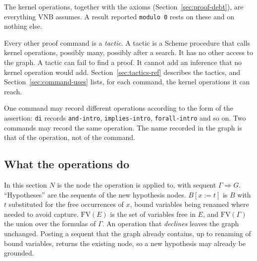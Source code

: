 The kernel operations, together with the axioms
(Section~\ref{sec:proof-debt}), are everything VNB assumes.  A result
reported \texttt{modulo 0} rests on these and on nothing else.

Every other proof command is a \emph{tactic}.  A tactic is a Scheme
procedure that calls kernel operations, possibly many, possibly after a
search.  It has no other access to the graph.  A tactic can fail to find
a proof.  It cannot add an inference that no kernel operation would add.
Section~\ref{sec:tactics-ref} describes the tactics, and
Section~\ref{sec:command-uses} lists, for each command, the kernel
operations it can reach.

\begin{remark}
One command may record different operations according to the form of the
assertion: \texttt{di} records \texttt{and-intro}, \texttt{implies-intro},
\texttt{forall-intro} and so on.  Two commands may record the same
operation.  The name recorded in the graph is that of the operation, not
of the command.
\end{remark}

\subsection{What the operations do}\label{sec:kernel-ops-detail}

\providecommand{\VNBfig}[3]{\[\frac{\displaystyle #2}{\displaystyle #3}\;\;\mbox{\texttt{#1}}\]}
\providecommand{\VNBnohyp}{\phantom{\Gamma}}
\providecommand{\FV}{\mathrm{FV}}
\providecommand{\aeq}{=_{\alpha}}
\providecommand{\VNBfigS}[3]{\[\frac{\displaystyle\begin{array}{c}#2\end{array}}{\displaystyle #3}\;\;\mbox{\texttt{#1}}\]}
\newenvironment{VNBcond}{\sloppy\begin{description}[font=\normalfont\itshape,leftmargin=0.85cm,itemsep=0.5mm,topsep=0.5mm]}{\end{description}}

In this section $N$ is the node the operation is applied to, with
sequent $\Gamma \Longrightarrow G$.  ``Hypotheses'' are the sequents of
the new hypothesis nodes.  $B[x{:=}t]$ is $B$ with $t$
substituted for the free occurrences of $x$, bound variables being
renamed where needed to avoid capture.  $\FV(E)$ is the set of variables
free in $E$, and $\FV(\Gamma)$ the union over the formulas of $\Gamma$.
An operation that \emph{declines} leaves the graph unchanged.  Posting a
sequent that the graph already contains, up to renaming of bound
variables, returns the existing node, so a new hypothesis may already be
grounded.

